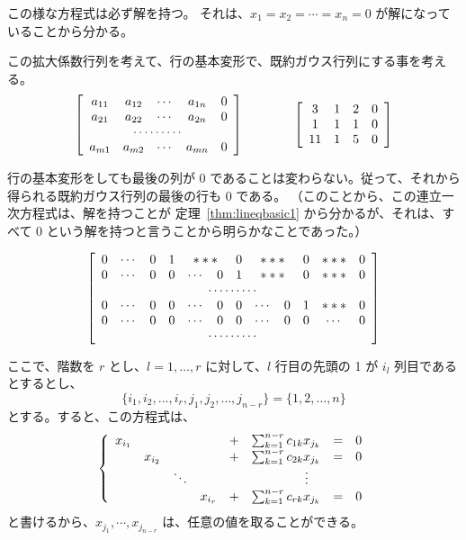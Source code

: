 この様な方程式は必ず解を持つ。
それは、$x_1 = x_2 = \cdots = x_n = 0$  が解になっていることから分かる。

この拡大係数行列を考えて、行の基本変形で、既約ガウス行列にする事を考える。
$$\left[\begin{array}{ccccc}
a_{11} & a_{12} & \cdots & a_{1n} & 0\\
a_{21} & a_{22} & \cdots & a_{2n} & 0\\
\multicolumn{5}{c}{\cdots\cdots\cdots}\\
a_{m1} & a_{m2} & \cdots & a_{mn} & 0\\
\end{array}
\right]\qquad\qquad 
\left[\begin{array}{cccc}
3 & 1 & 2 & 0\\
1 & 1 & 1 & 0\\
11 & 1 & 5 & 0
\end{array}\right]$$

行の基本変形をしても最後の列が 0 であることは変わらない。従って、それから得られる既約ガウス行列の最後の行も 0 である。
（このことから、この連立一次方程式は、解を持つことが 定理~\ref{thm:lineqbasic1} から分かるが、それは、すべて 0 という解を持つと言うことから明らかなことであった。）

$$\left[\begin{array}{cccccccccccc}
0 & \cdots & 0 & 1 & \multicolumn{2}{c}{***} & 0 & \multicolumn{2}{c}{***} & 0 & *** & 0\\
0 & \cdots & 0 & 0 & \cdots & 0 & 1 & \multicolumn{2}{c}{***} & 0 & *** & 0\\
\multicolumn{12}{c}{\cdots\cdots\cdots}\\
0 & \cdots & 0 & 0 & \cdots & 0 & 0 & \cdots & 0 & 1 & *** & 0\\
0 & \cdots & 0 & 0 & \cdots & 0 & 0 & \cdots & 0 & 0 & \cdots & 0\\
\multicolumn{12}{c}{\cdots\cdots\cdots}
\end{array}
\right]$$

ここで、階数を $r$ とし、$l = 1,\ldots, r$ に対して、$l$ 行目の先頭の 1 が $i_l$ 列目であるとするとし、
$$\{i_1,i_2,\ldots,i_r,j_1,j_2,\ldots,j_{n-r}\} = \{1,2,\ldots,n\}$$
とする。すると、この方程式は、
$$\left\{\begin{array}{cccccccc}
x_{i_1} & & & & + & \sum_{k=1}^{n-r}c_{1k}x_{j_k} & = & 0\\
 & x_{i_2} & & & + & \sum_{k=1}^{n-r}c_{2k}x_{j_k} & = & 0\\
  & & \ddots & &  & \multicolumn{3}{c}{\vdots} \\
  & & & x_{i_r} & + & \sum_{k=1}^{n-r}c_{rk}x_{j_k} & = & 0
\end{array}\right.$$
と書けるから、$x_{j_1},\cdots, x_{j_{n-r}}$ は、任意の値を取ることができる。

